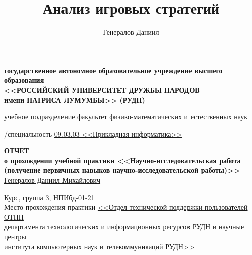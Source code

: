 \documentclass{article}
\title{Анализ игровых стратегий}
\author{Генералов Даниил}
\begin{document}
\begin{titlepage}
    \setlength{\parindent}{0cm}
    
    \begin{center}
    \hfill \break 
    \textbf{
     государственное автономное образовательное учреждение высшего образования\\
    \normalsize<<РОССИЙСКИЙ УНИВЕРСИТЕТ ДРУЖБЫ НАРОДОВ\\ имени ПАТРИСА ЛУМУМБЫ>> (РУДН)
    }
    \vspace{1cm}

    \begin{paracol}{2}
       учебное подразделение
      \switchcolumn
      \underline{факультет физико-математических}
      \underline{и естественных наук}
    \end{paracol}

    \vspace{0.5em}

    \begin{paracol}{2}
      /специальность
      \switchcolumn
      \underline{09.03.03 <<Прикладная информатика>>}
      \end{paracol}
    \centering
    
    \vspace*{\fill}
    
    \textbf{ОТЧЕТ} \\
    \vspace{1em}
    \textbf{о прохождении учебной практики <<Научно-исследовательская работа\\ (получение первичных навыков научно-исследовательской работы)>>}
    \\ \vspace{5mm}
    \normalsize{\underline{Генералов Даниил Михайлович}}
    \vspace{1em}
    \end{center}
    
    Курс, группа \underline{3, НПИбд-01-21} \\

    Место прохождения практики 
    \underline{<<Отдел технической поддержки пользователей ОТПП}\\
    \underline{департамента технологических и информационных ресурсов РУДН и научные центры}\\
    \underline{института компьютерных наук и телекоммуникаций РУДН>>} \\


\end{titlepage}
\end{document}
